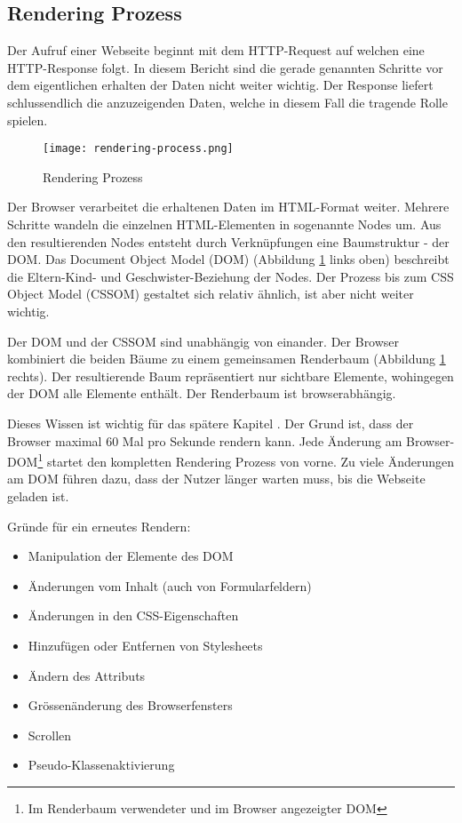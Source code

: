 \subsection{Rendering Prozess}
\label{sec:structureRendering}

Der Aufruf einer Webseite beginnt mit dem HTTP-Request auf welchen eine HTTP-Response folgt.
In diesem Bericht sind die gerade genannten Schritte vor dem eigentlichen erhalten der Daten nicht weiter wichtig.
Der Response liefert schlussendlich die anzuzeigenden Daten, welche in diesem Fall die tragende Rolle spielen.

\begin{figure}[!htb]
    \centering
    \texttt{[image: rendering-process.png]}
    \caption{Rendering Prozess}
    \label{img:renderingProcess}
\end{figure}

Der Browser verarbeitet die erhaltenen Daten im HTML-Format weiter.
Mehrere Schritte wandeln die einzelnen HTML-Elementen in sogenannte Nodes um. 
Aus den resultierenden Nodes entsteht durch Verknüpfungen eine Baumstruktur - der DOM.
Das Document Object Model (DOM) (Abbildung \ref{img:renderingProcess} links oben) beschreibt die Eltern-Kind- und Geschwister-Beziehung der Nodes.
Der Prozess bis zum CSS Object Model (CSSOM) gestaltet sich relativ ähnlich, ist aber nicht weiter wichtig.

Der DOM und der CSSOM sind unabhängig von einander. 
Der Browser kombiniert die beiden Bäume zu einem gemeinsamen Renderbaum (Abbildung \ref{img:renderingProcess} rechts).
Der resultierende Baum repräsentiert nur sichtbare Elemente, wohingegen der DOM alle Elemente enthält.
Der Renderbaum ist browserabhängig.

Dieses Wissen ist wichtig für das spätere Kapitel \textbf{}. 
Der Grund ist, dass der Browser maximal 60 Mal pro Sekunde rendern kann.
Jede Änderung am Browser-DOM\footnote{
    Im Renderbaum verwendeter und im Browser angezeigter DOM
} startet den kompletten Rendering Prozess von vorne.
Zu viele Änderungen am DOM führen dazu, dass der Nutzer länger warten muss, bis die Webseite geladen ist.

Gründe für ein erneutes Rendern:

\begin{itemize}
    \item Manipulation der Elemente des DOM
    \item Änderungen vom Inhalt (auch von Formularfeldern)
    \item Änderungen in den CSS-Eigenschaften
    \item Hinzufügen oder Entfernen von Stylesheets
    \item Ändern des Attributs 
    \item Grössenänderung des Browserfensters
    \item Scrollen
    \item Pseudo-Klassenaktivierung
\end{itemize}


